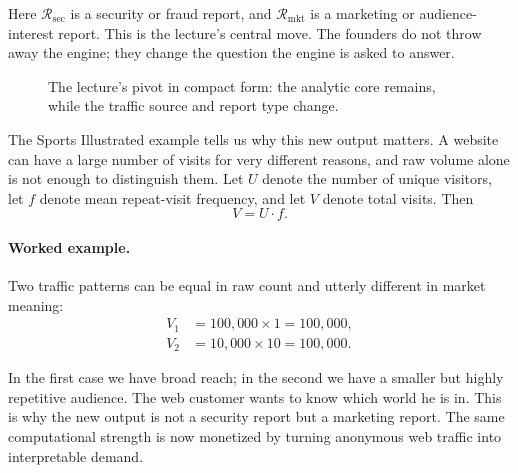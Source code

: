 Here \(\mathcal{R}_{\mathrm{sec}}\) is a security or fraud report, and \(\mathcal{R}_{\mathrm{mkt}}\) is a marketing or audience-interest report. This is the lecture's central move. The founders do not throw away the engine; they change the question the engine is asked to answer.

\begin{figure}[h]
\centering
{}
\caption{The lecture's pivot in compact form: the analytic core remains, while the traffic source and report type change.}
\end{figure}

The Sports Illustrated example tells us why this new output matters. A website can have a large number of visits for very different reasons, and raw volume alone is not enough to distinguish them. Let \(U\) denote the number of unique visitors, let \(f\) denote mean repeat-visit frequency, and let \(V\) denote total visits. Then
\begin{equation}
V = U\cdot f.
\end{equation}

\paragraph{Worked example.} Two traffic patterns can be equal in raw count and utterly different in market meaning:
\begin{align}
V_1 &= 100{,}000\times 1 = 100{,}000,\\
V_2 &= 10{,}000\times 10 = 100{,}000.
\end{align}

In the first case we have broad reach; in the second we have a smaller but highly repetitive audience. The web customer wants to know which world he is in. This is why the new output is not a security report but a marketing report. The same computational strength is now monetized by turning anonymous web traffic into interpretable demand.

